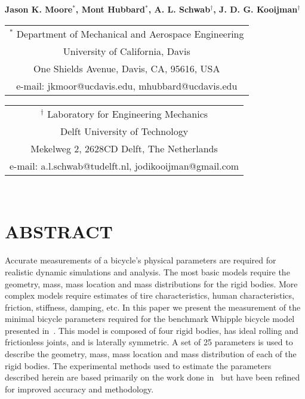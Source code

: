 \documentclass{bmd2010p}
\begin{document}
\begin{center}
\end{center}

\begin{center}
\normalsize{\bf{Jason K. Moore$^{*}$, Mont Hubbard$^{*}$, A. L. Schwab$^\dag$,
            J. D. G. Kooijman$^\dag$}}
\end{center}

\begin{center}
\begin{tabular}{c}
$^*$ Department of Mechanical and Aerospace Engineering\\
University of California, Davis\\
One Shields Avenue, Davis, CA, 95616, USA\\
e-mail: jkmoor@ucdavis.edu, mhubbard@ucdavis.edu\\
\end{tabular}
\begin{tabular}{c}
$^\dag$ Laboratory for Engineering Mechanics\\
Delft University of Technology\\
Mekelweg 2, 2628CD Delft, The Netherlands\\
e-mail: a.l.schwab@tudelft.nl, jodikooijman@gmail.com\\
\end{tabular} \\ \vspace{2.5ex}
\end{center}
\section*{ABSTRACT}
Accurate measurements of a bicycle's physical parameters are required for
realistic dynamic simulations and analysis. The most basic models require the
geometry, mass, mass location and mass distributions for the rigid bodies. More
complex models require estimates of tire characteristics, human
characteristics, friction, stiffness, damping, etc. In this
paper we present the measurement of the minimal bicycle parameters required for
the benchmark Whipple bicycle model presented in~\cite{Meijaard2007}. This
model is composed of four rigid bodies, has ideal rolling and frictionless joints,
and is laterally symmetric. A set of 25 parameters is used to describe the
geometry, mass, mass location and mass distribution of each of the rigid
bodies. The experimental methods used to estimate the parameters described
herein are based primarily on the work done in~\cite{Kooijman2006} but have
been refined for improved accuracy and methodology.
\end{document}
